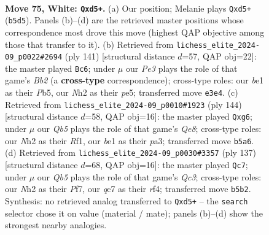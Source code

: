 \documentclass[11pt]{article}
\begin{document}
\clearpage

\begin{figure}[p]\centering
\begin{subfigure}{0.46\textwidth}\centering
\resizebox{\linewidth}{!}{%
\newchessgame
\chessboard[
  setfen={k4r1r/p1q3p1/7p/1Q1p3P/3P2P1/4P3/7N/4b2K w - - 5 75},
  showmover=false,
  pgfstyle=straightmove, color=movearrow, markmove={b5-d5}
]}
\caption{}
\end{subfigure}\hfill
\begin{subfigure}{0.46\textwidth}\centering
\resizebox{\linewidth}{!}{%
\newchessgame
\chessboard[
  setfen={8/1b4pk/4p3/1pP1P1pP/1P3qP1/2R4K/8/4Q3 b - - 9 71},
  showmover=false,
  pgfstyle=straightmove, color=movearrow, markmove={b7-c6}
]}
\caption{}
\end{subfigure}
\\[4pt]
\begin{subfigure}{0.46\textwidth}\centering
\resizebox{\linewidth}{!}{%
\newchessgame
\chessboard[
  setfen={4Q3/1kp5/6p1/5p1p/2q4P/pr4P1/5P2/5RK1 w - - 0 73},
  showmover=false,
  pgfstyle=straightmove, color=movearrow, markmove={e8-g6}
]}
\caption{}
\end{subfigure}\hfill
\begin{subfigure}{0.46\textwidth}\centering
\resizebox{\linewidth}{!}{%
\newchessgame
\chessboard[
  setfen={8/5pk1/2q3p1/7p/5R1P/1p4P1/1P2R2K/8 b - - 21 69},
  showmover=false,
  pgfstyle=straightmove, color=movearrow, markmove={c6-c7}
]}
\caption{}
\end{subfigure}
\caption{\textbf{Move 75, White: \texttt{Qxd5+}.} (a) Our position; Melanie plays \texttt{Qxd5+} (\texttt{b5d5}). Panels (b)--(d) are the retrieved master positions whose correspondence most drove this move (highest QAP objective among those that transfer to it). (b) Retrieved from \texttt{lichess\_elite\_2024-09\_p0022\#2694} (ply 141) [structural distance $d$=57, QAP obj=22]: the master played \texttt{Bc6}; under $\mu$ our \emph{Pe3} plays the role of that game's \emph{Bb2} (a \textbf{cross-type} correspondence); cross-type roles: our \emph{b}e1 as their \emph{P}b5, our \emph{N}h2 as their \emph{p}e5; transferred move \texttt{e3e4}. (c) Retrieved from \texttt{lichess\_elite\_2024-09\_p0010\#1923} (ply 144) [structural distance $d$=58, QAP obj=16]: the master played \texttt{Qxg6}; under $\mu$ our \emph{Qb5} plays the role of that game's \emph{Qe8}; cross-type roles: our \emph{N}h2 as their \emph{R}f1, our \emph{b}e1 as their \emph{p}a3; transferred move \texttt{b5a6}. (d) Retrieved from \texttt{lichess\_elite\_2024-09\_p0030\#3357} (ply 137) [structural distance $d$=68, QAP obj=16]: the master played \texttt{Qc7}; under $\mu$ our \emph{Qb5} plays the role of that game's \emph{Qc3}; cross-type roles: our \emph{N}h2 as their \emph{P}f7, our \emph{q}c7 as their \emph{r}f4; transferred move \texttt{b5b2}. Synthesis: no retrieved analog transferred to \texttt{Qxd5+} -- the \texttt{search} selector chose it on value (material / mate); panels (b)--(d) show the strongest nearby analogies.}
\label{fig:thought-m148}
\end{figure}
\end{document}
